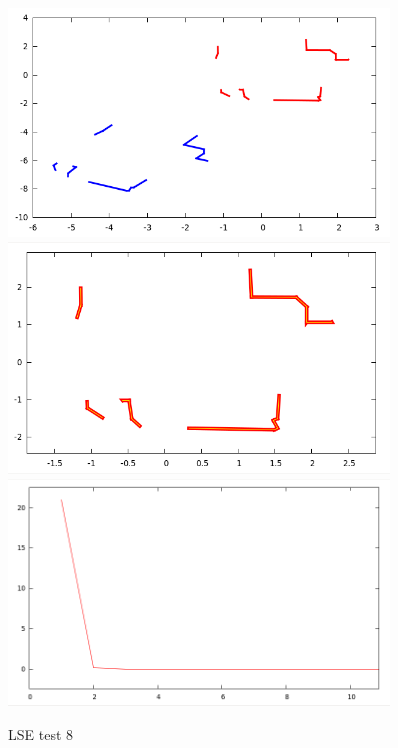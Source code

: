 \documentclass[a4paper, onecolumn]{report}
\begin{document}
\begin{figure}[htbp]
\centering
\includegraphics[width=0.9\textwidth]{images/foto_test/0.5_7_0.5236/before_after.png}
\includegraphics[width=0.9\textwidth]{images/foto_test/0.5_7_0.5236/result.png}
\includegraphics[width=0.9\textwidth]{images/foto_test/0.5_7_0.5236/chi_new.png}
\caption{LSE test 8}
\end{figure}
\end{document}
